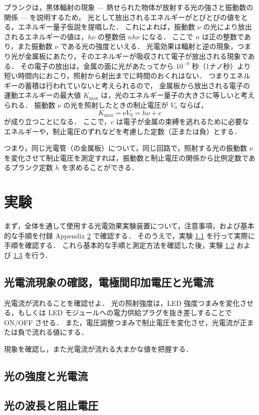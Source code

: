 \documentclass[11pt,a4,epsf]{jarticle}
\begin{document}
プランクは，黒体輻射の現象 --- 
熱せられた物体が放射する光の強さと振動数の関係 --- を説明するため，
光として放出されるエネルギーがとびとびの値をとる，エネルギー量子仮説を提唱した．
これによれば，振動数 $\nu$ の光により放出されるエネルギーの値は，$h \nu$ の整数倍 $n h \nu$ になる．
ここで $n$ は正の整数であり，また振動数 $\nu$ である光の強度といえる．
光電効果は輻射と逆の現象，つまり光が金属板にあたり，そのエネルギーが吸収されて電子が放出される現象である．
その電子の放出は，金属の面に光があたってから $10^{-9}$ 秒（1ナノ秒）より短い時間内におこり，照射から射出までに時間のおくれはない\cite{Aya-}．
つまりエネルギーの蓄積は行われていないと考えられるので，
金属板から放出される電子の運動エネルギーの最大値 $K_{\max}$ は，光のエネルギー量子の大きさに等しいと考えられる．
振動数 $\nu$ の光を照射したときの制止電圧が $V_0$ ならば，
\[
K_{\max} = \mbox{e} V_0 = h \nu + c
\]
が成り立つことになる．
ここで，$c$ は電子が金属の束縛を逃れるために必要なエネルギーや，制止電圧のずれなどを考慮した定数（正または負）とする．

つまり，同じ光電管（の金属板）について，同じ回路で，照射する光の振動数 $\nu$ を変化させて制止電圧を測定すれば，振動数と制止電圧の関係から比例定数であるプランク定数 $h$ を求めることができる．

\section{実験}

まず，全体を通して使用する光電効果実験装置について，注意事項，および基本的な手順を付録 Appendix \ref{apdx:aparatus} で確認する．
そのうえで，実験 \ref{a} を行って実際に手順を確認する．
これら基本的な手順と測定方法を確認した後，実験 \ref{b} および \ref{c} を行う．


\subsection{光電流現象の確認，電極間印加電圧と光電流}\label{a}

光電流が流れることを確認せよ．
光の照射強度は，LED 強度つまみを変化させる，もしくは LED モジュールへの電力供給プラグを抜き差しすることで ON/OFF させる．
また，電圧調整つまみで制止電圧を変化させ，光電流が正または負で流れる値にする．

現象を確認し，また光電流が流れる大まかな値を把握する．

\subsection{光の強度と光電流}\label{b}

\subsection{光の波長と阻止電圧}\label{c}

\appendix
\section{}\label{apdx:aparatus}
\end{document}
